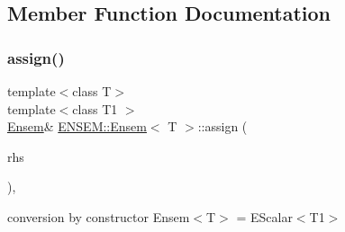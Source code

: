 \subsection{Member Function Documentation}
\mbox{\label{classENSEM_1_1Ensem_aa09448269bc5b72687905254739bf69a}} 
\subsubsection{\texorpdfstring{assign()}{assign()}\hspace{0.1cm}{\footnotesize\ttfamily [1/8]}}
{\footnotesize\ttfamily template$<$class T$>$ \\
template$<$class T1 $>$ \\
\mbox{\hyperlink{classENSEM_1_1Ensem}{Ensem}}\& \mbox{\hyperlink{classENSEM_1_1Ensem}{E\+N\+S\+E\+M\+::\+Ensem}}$<$ T $>$\+::assign (\begin{DoxyParamCaption}\item[{const \mbox{\hyperlink{classENSEM_1_1EScalar}{E\+Scalar}}$<$ T1 $>$ \&}]{rhs }\end{DoxyParamCaption})\hspace{0.3cm}{\ttfamily [inline]}, {\ttfamily [protected]}}



conversion by constructor Ensem$<$\+T$>$ = E\+Scalar$<$\+T1$>$ 

